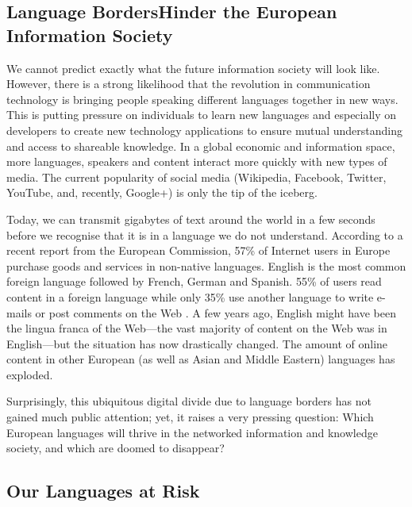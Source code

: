 \begin{multicols}{2}
\subsection[Language Borders Hinder the European Information Society]{Language Borders\newline Hinder the European Information Society}

    We cannot predict exactly what the future information society will look like. However, there is a strong likelihood that the revolution in communication technology is bringing people speaking different languages together in new ways. This is putting pressure on individuals to learn new languages and especially on developers to create new technology applications to ensure mutual understanding and access to shareable knowledge. In a global economic and information space, more languages, speakers and content interact more quickly with new types of media. The current popularity of social media (Wikipedia, Facebook, Twitter, YouTube, and, recently, Google+) is only the tip of the iceberg.


    Today, we can transmit gigabytes of text around the world in a few seconds before we recognise that it is in a language we do not understand. According to a recent report from the European Commission, 57\% of Internet users in Europe purchase goods and services in non-native languages. English is the most common foreign language followed by French, German and Spanish. 55\% of users read content in a foreign language while only 35\% use another language to write e-mails or post comments on the Web \cite{CAT-Nota1}. A few years ago, English might have been the lingua franca of the Web—the vast majority of content on the Web was in English—but the situation has now drastically changed. The amount of online content in other European (as well as Asian and Middle Eastern) languages has exploded.

    Surprisingly, this ubiquitous digital divide due to language borders has not gained much public attention; yet, it raises a very pressing question: Which European languages will thrive in the networked information and knowledge society, and which are doomed to disappear?

\subsection{Our Languages at Risk}


\end{multicols}
